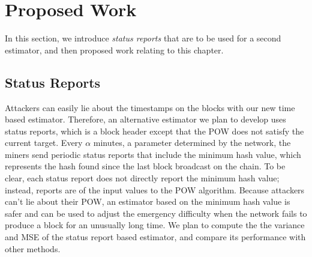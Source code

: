
\section{Proposed Work} \label{section:difficulty-proposed-work}
In this section, we introduce \textit{status reports} that are to be used for a second estimator, and then proposed work relating to this chapter.

\subsection{Status Reports}
Attackers can easily lie about the timestamps on the blocks with our new time based estimator. Therefore, an alternative estimator we plan to develop uses status reports, which is a block header except that the POW does not satisfy the current target. Every $\alpha$ minutes, a parameter determined by the network, the miners send periodic status reports that include the minimum hash value, which represents the hash found since the last block broadcast on the chain. To be clear, each status report does not directly report the minimum hash value; instead, reports are of the input values to the POW algorithm. Because attackers can't lie about their POW, an estimator based on the minimum hash value is safer and can be used to adjust the emergency difficulty when the network fails to produce a block for an unusually long time. We plan to compute the the variance and MSE of the status report based estimator, and compare its performance with other methods.

